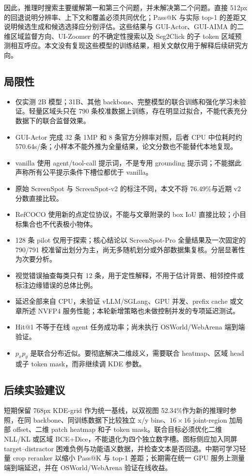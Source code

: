 \documentclass[UTF8,a4paper,11pt,fontset=none]{ctexart}
\begin{document}
因此，推理时搜索主要缓解第一和第三个问题，并未解决第二个问题。直接 512px 的回退说明分辨率、上下文和覆盖必须共同优化；Pass@K 与实际 top-1 的差距又说明候选生成和候选选择应分别评估。这些结果与 GUI-Actor、GUI-AIMA 的二维区域监督方向\cite{guiactor,guiaima}、UI-Zoomer 的不确定性搜索\cite{uizoomer}以及 Seg2Click 的子 token 区域预测\cite{seg2click}相互呼应。本文没有复现这些模型的训练结果，相关文献仅用于解释后续研究方向。

\subsection{局限性}
\begin{itemize}
  \item 仅实测 2B 模型；31B、其他 backbone、完整模型的联合训练和强化学习未验证。轻量区域头只在 790 条校准数据上训练，存在明显过拟合，不能代表充分数据下的联合监督效果。
  \item GUI-Actor 完成 32 条 1MP 和 8 条官方分辨率对照，后者 CPU 中位耗时约 570.64s/条；小样本不能外推为全量结果，论文分数也不能替代本地复现。
  \item vanilla 使用 agent/tool-call 提示词，不是专用 grounding 提示词；不能据此声称所有公平提示条件下槽位都优于 vanilla。
  \item 原始 ScreenSpot 与 ScreenSpot-v2 的标注不同，本文不将 76.49\%与近期 v2 分数直接比较。
  \item RefCOCO 使用新的点定位协议，不能与文章附录的 box IoU 直接比较；小目标集合也不代表极小物体。
  \item 128 条 pilot 仅用于探索；核心结论以 ScreenSpot-Pro 全量结果及一次固定的 790/791 校准留出划分为主，尚无多随机划分或外部数据集复核。分层显著性为次要分析。
  \item 视觉错误抽查每类只有 12 条，用于定性解释，不用于估计背景、相邻控件或标注边缘错误的总体比例。
  \item 延迟全部来自 CPU，未验证 vLLM/SGLang、GPU 并发、prefix cache 或文章所述 NVFP4 服务性能；本轮新增策略也未做控制并发的专项延迟测试。
  \item Hit@1 不等于在线 agent 任务成功率；尚未执行 OSWorld/WebArena 端到端验证。
  \item $p_xp_y$ 是联合分布近似。要彻底解决二维歧义，需要联合 heatmap、区域 head 或子 token mask，而非继续调 KDE 参数。
\end{itemize}

\subsection{后续实验建议}
短期保留 768px KDE-grid 作为统一基线，以双视图 52.34\%作为新的推理时参照，在同 backbone、同训练数据下比较独立 x/y bins、$16\times16$ joint-region 加局部 offset、二维 patch heatmap 和子 token mask。联合目标必须优化二维 NLL/KL 或区域 BCE+Dice，不能退化为四个独立数字槽。图标侧应加入同屏 target--distractor 困难负例与功能语义数据，并检查文本是否回退。中期可学习轻量 crop reranker 以缩小 Pass@K 与 top-1 差距；长期需在统一 GPU 服务上测量端到端延迟，并在 OSWorld/WebArena 验证在线收益。
\end{document}
